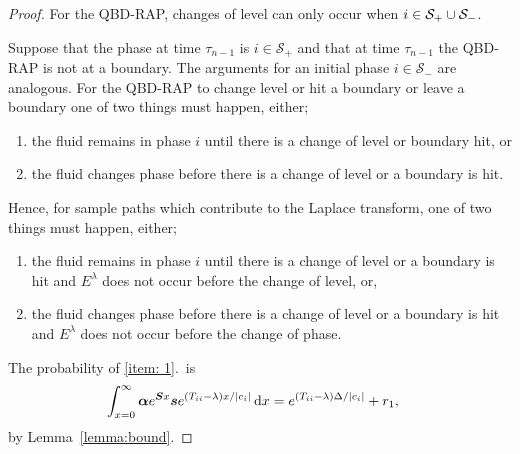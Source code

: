 \begin{proof}
	For the QBD-RAP, changes of level can only occur when \(i\in\mathcal S_+\cup\mathcal{S}_-\). 
	
	Suppose that the phase at time \(\tau_{n-1}\) is \(i\in\mathcal S_+\) and that at time \(\tau_{n-1}\) the QBD-RAP is not at a boundary. The arguments for an initial phase \(i\in\mathcal S_-\) are analogous. For the QBD-RAP to change level or hit a boundary or leave a boundary one of two things must happen, either; 
	\begin{enumerate}
		\item the fluid remains in phase \(i\) until there is a change of level or boundary hit, or
		\item the fluid changes phase before there is a change of level or a boundary is hit. 
	\end{enumerate}
	
	Hence, for sample paths which contribute to the Laplace transform, one of two things must happen, either; 
	\begin{enumerate}
		\item the fluid remains in phase \(i\) until there is a change of level or a boundary is hit and \(E^\lambda\) does not occur before the change of level, or, \label{item: 1}
		\item the fluid changes phase before there is a change of level or a boundary is hit and \(E^\lambda\) does not occur before the change of phase. \label{item: 2}
	\end{enumerate}
	
	The probability of \ref{item: 1}.~is 
	\begin{align}
		\int_{x=0}^\infty \boldsymbol \alpha e^{\boldsymbol{S}x}\boldsymbol s e^{(T_{ii}-\lambda)x/|c_i|}\, \mathrm{d} x 
		&= e^{(T_{ii}-\lambda)\Delta/|c_i|} + r_1,\label{eqn: bnd this 12345}
	\end{align}
	by Lemma~\ref{lemma:bound}.
	

\end{proof}
